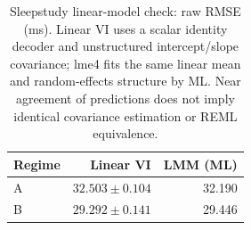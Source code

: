\begin{table}[htbp]
\centering
\small
\caption{Sleepstudy linear-model check: raw RMSE (ms). Linear VI uses a scalar identity decoder and unstructured intercept/slope covariance; lme4 fits the same linear mean and random-effects structure by ML. Near agreement of predictions does not imply identical covariance estimation or REML equivalence.}
\label{tab:linear_check}
\begin{tabular}{lrr}
\toprule
Regime & Linear VI & LMM (ML) \\
\midrule
A & $32.503 \pm 0.104$ & 32.190 \\
B & $29.292 \pm 0.141$ & 29.446 \\
\bottomrule
\end{tabular}
\end{table}
